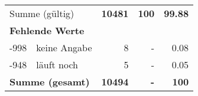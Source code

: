 \begin{longtable}{lXrrr}
     \midrule
     \multicolumn{2}{l}{Summe (gültig)} &
       \textbf{\num{10481}} &
     \textbf{100} &
       \textbf{\num[round-mode=places,round-precision=2]{99,88}} \\
     \multicolumn{5}{l}{\textbf{Fehlende Werte}}\\
       -998 &
       keine Angabe &
         \num{8} &
        - &
         \num[round-mode=places,round-precision=2]{0,08} \\
       -948 &
       läuft noch &
         \num{5} &
        - &
         \num[round-mode=places,round-precision=2]{0,05} \\
     \midrule
     \multicolumn{2}{l}{\textbf{Summe (gesamt)}} &
          \textbf{\num{10494}} &
        \textbf{-} &
        \textbf{100} \\
     \bottomrule
     \end{longtable}
     
